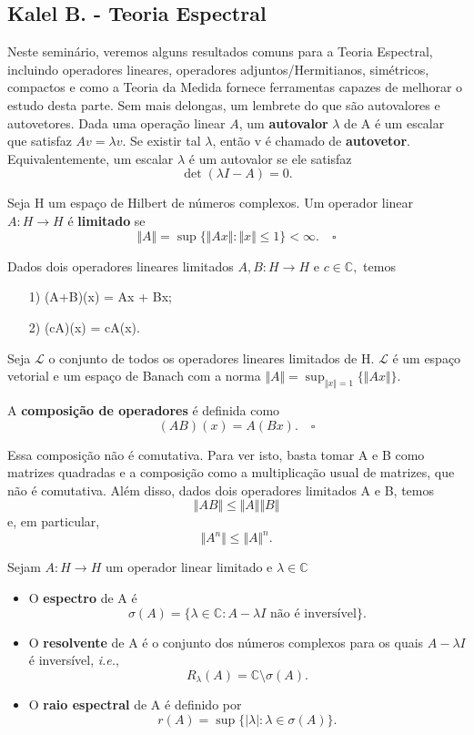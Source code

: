 \documentclass[measure_theory.tex]{subfiles}
\begin{document}
\subsection{Kalel B. - Teoria Espectral}
Neste seminário, veremos alguns resultados comuns para a Teoria Espectral, incluindo operadores lineares, operadores adjuntos/Hermitianos, simétricos, compactos e como a Teoria da Medida fornece ferramentas
capazes de melhorar o estudo desta parte. Sem mais delongas, um lembrete do que são autovalores e autovetores. Dada uma operação linear \(A\), um \textbf{autovalor} \(\lambda \) de A é um escalar que satisfaz \(Av = \lambda v\).
Se existir tal \(\lambda \), então v é chamado de \textbf{autovetor}. Equivalentemente, um escalar \(\lambda \) é um autovalor se ele satisfaz
\[
	\det{(\lambda I - A)} = 0.
\]
\begin{def*}
	Seja H um espaço de Hilbert de números complexos. Um operador linear \(A:H\rightarrow H \) é \textbf{limitado} se
	\[
		\Vert A \Vert = \sup_{}\{\Vert Ax \Vert: \Vert x \Vert \leq 1\} < \infty.\quad \square
	\]
\end{def*}
\begin{prop*}
	Dados dois operadores lineares limitados \(A, B:H\rightarrow H\) e \(c\in \mathbb{C},\) temos
	\begin{itemize}
		\item[1)](A+B)(x) = Ax + Bx;
		\item[2)] (cA)(x) = cA(x).
	\end{itemize}
\end{prop*}
\begin{prop*}
	Seja \(\mathcal{L}\) o conjunto de todos os operadores lineares limitados de H. \(\mathcal{L}\) é um espaço vetorial e um espaço de Banach com a norma \(\Vert A \Vert = \sup_{\Vert x \Vert = 1}\{\Vert Ax \Vert\}.\)
\end{prop*}
\begin{def*}
	A \textbf{composição de operadores} é definida como
	\[
		(AB)(x) = A(Bx).\quad \square
	\]
\end{def*}
Essa composição não é comutativa. Para ver isto, basta tomar A e B como matrizes quadradas e a composição como a multiplicação usual de matrizes, que não é comutativa.
Além disso, dados dois operadores limitados A e B, temos
\[
	\Vert AB \Vert \leq \Vert A \Vert\Vert B \Vert
\]
e, em particular,
\[
	\Vert A^{n} \Vert\leq \Vert A \Vert^{n}.
\]
\begin{def*}
	Sejam \(A:H\rightarrow H\) um operador linear limitado e \(\lambda \in \mathbb{C}\)
	\begin{itemize}
		\item O \textbf{espectro} de A é
		      \[
			      \sigma (A) = \{\lambda \in \mathbb{C}: A - \lambda I \text{ não é inversível}\}.
		      \]
		\item O \textbf{resolvente} de A é o conjunto dos números complexos para os quais \(A - \lambda I\) é inversível, \textit{i.e.},
		      \[
			      R_{\lambda }(A) = \mathbb{C}\setminus{\sigma (A)}.
		      \]
		\item O \textbf{raio espectral} de A é definido por
		      \[
			      r(A) = \sup_{}\{|\lambda |: \lambda \in \sigma (A)\}.
		      \]
	\end{itemize}
\end{def*}
\end{document}
